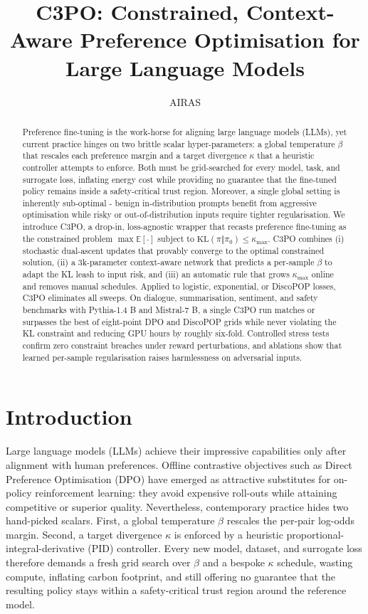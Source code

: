 \documentclass{article}
\title{C3PO: Constrained, Context-Aware Preference Optimisation for Large Language Models}
\author{AIRAS}
\begin{document}
\maketitle

\begin{abstract}
Preference fine-tuning is the work-horse for aligning large language models (LLMs), yet current practice hinges on two brittle scalar hyper-parameters: a global temperature \(\beta\) that rescales each preference margin and a target divergence \(\kappa\) that a heuristic controller attempts to enforce. Both must be grid-searched for every model, task, and surrogate loss, inflating energy cost while providing no guarantee that the fine-tuned policy remains inside a safety-critical trust region. Moreover, a single global setting is inherently sub-optimal - benign in-distribution prompts benefit from aggressive optimisation while risky or out-of-distribution inputs require tighter regularisation. We introduce C3PO, a drop-in, loss-agnostic wrapper that recasts preference fine-tuning as the constrained problem \(\max \mathbb{E}[\cdot]\) subject to \(\mathrm{KL}(\pi\Vert\pi_{0}) \le \kappa_{\max}\). C3PO combines (i) stochastic dual-ascent updates that provably converge to the optimal constrained solution, (ii) a 3k-parameter context-aware network that predicts a per-sample \(\beta\) to adapt the KL leash to input risk, and (iii) an automatic rule that grows \(\kappa_{\max}\) online and removes manual schedules. Applied to logistic, exponential, or DiscoPOP losses, C3PO eliminates all sweeps. On dialogue, summarisation, sentiment, and safety benchmarks with Pythia-1.4 B and Mistral-7 B, a single C3PO run matches or surpasses the best of eight-point DPO and DiscoPOP grids while never violating the KL constraint and reducing GPU hours by roughly six-fold. Controlled stress tests confirm zero constraint breaches under reward perturbations, and ablations show that learned per-sample regularisation raises harmlessness on adversarial inputs.
\end{abstract}

\section{Introduction}
Large language models (LLMs) achieve their impressive capabilities only after alignment with human preferences. Offline contrastive objectives such as Direct Preference Optimisation (DPO) have emerged as attractive substitutes for on-policy reinforcement learning: they avoid expensive roll-outs while attaining competitive or superior quality. Nevertheless, contemporary practice hides two hand-picked scalars. First, a global temperature \(\beta\) rescales the per-pair log-odds margin. Second, a target divergence \(\kappa\) is enforced by a heuristic proportional-integral-derivative (PID) controller. Every new model, dataset, and surrogate loss therefore demands a fresh grid search over \(\beta\) and a bespoke \(\kappa\) schedule, wasting compute, inflating carbon footprint, and still offering no guarantee that the resulting policy stays within a safety-critical trust region around the reference model.
\end{document}
